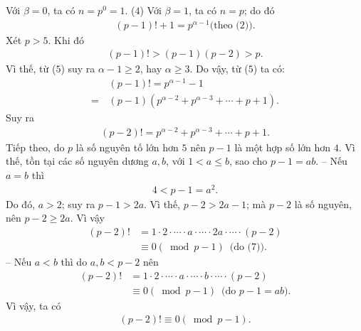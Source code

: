 \begin{multicols}{2}
	Với $\beta= 0$, ta có $n = p^0 = 1$. \hfill ($4$)
	\vskip 0.05cm
	Với $\beta = 1$, ta có $n = p$; do đó
	\begin{align*}
		\left( {p - 1} \right)! + 1 = {p^{\alpha  - 1}}	\text{(theo ($2$))}. \tag{$5$}
	\end{align*}                                                      
	Xét $p > 5$. Khi đó
	\begin{align*}
		\left( {p - 1} \right)! > \left( {p - 1} \right)\left( {p - 2} \right) > p.
	\end{align*}
	Vì thế, từ ($5$) suy ra $\alpha -1\ge 2$, hay $\alpha \ge 3$. Do vậy, từ ($5$) ta có:
	\begin{align*}
		&\left( {p - 1} \right)! = {p^{\alpha  - 1}} - 1 \\
		=\, &\left( {p - 1} \right)\left( {{p^{\alpha  - 2}} + {p^{\alpha  - 3}} +  \cdots  + p + 1} \right).
	\end{align*}
	Suy ra
	\begin{align*}
		\left( {p \!-\! 2} \right)! \!=\! {p^{\alpha  \!-\! 2}} \!+\! {p^{\alpha  \!-\! 3}} \!+\!  \cdots  \!+\! p \!+\! 1. \tag{$6$}
	\end{align*}
	Tiếp theo, do $p$ là số nguyên tố lớn hơn $5$ nên $p - 1$ là một hợp số lớn hơn $4$. Vì thế, tồn tại các số nguyên dương $a, b$, với $1 < a \le b$, sao cho $p - 1 = ab$.
	\vskip 0.05cm
	-- Nếu $a = b$ thì
	\begin{align*}
		4 < p - 1 = {a^2}. \tag{$7$}
	\end{align*}
	Do đó, $a > 2$; suy ra $p - 1 > 2a$. Vì thế, $p - 2 > 2a - 1$; mà $p - 2$ là số nguyên, nên $p - 2 \ge 2a$. Vì vậy
	\begin{align*}
	\left( {p - 2} \right)! &= 1 \cdot 2 \cdot  \cdots  \cdot a \cdot  \cdots  \cdot 2a \cdot  \cdots  \cdot \left( {p - 2} \right) \\
	&\equiv 0\left(\!\! {\bmod p - 1} \right)	\,\,\,\text{(do ($7$))}.
	\end{align*}
	-- Nếu $a < b$ thì do $a, b < p - 2$ nên
	\begin{align*}
		\left( {p - 2} \right)! &= 1 \cdot 2 \cdot  \cdots  \cdot a \cdot  \cdots  \cdot b \cdot  \cdots  \cdot \left( {p - 2} \right) \\
		&\equiv 0\left(\!\! {\bmod p - 1} \right) \,\,\,\text{(do $p - 1 = ab$).}
	\end{align*}
	Vì vậy, ta có
	\begin{align*}
		\left( {p - 2} \right)! \equiv 0\left( {\bmod p - 1} \right). \tag{$8$}
	\end{align*}

\end{multicols}
